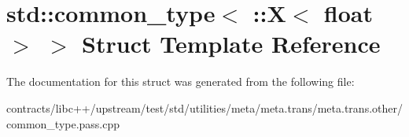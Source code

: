 \hypertarget{structstd_1_1common__type_3_01_1_1_x_3_01float_01_4_01_4}{}\section{std\+:\+:common\+\_\+type$<$ \+:\+:X$<$ float $>$ $>$ Struct Template Reference}
\label{structstd_1_1common__type_3_01_1_1_x_3_01float_01_4_01_4}


The documentation for this struct was generated from the following file\+:\begin{DoxyCompactItemize}
\item 
contracts/libc++/upstream/test/std/utilities/meta/meta.\+trans/meta.\+trans.\+other/common\+\_\+type.\+pass.\+cpp\end{DoxyCompactItemize}
